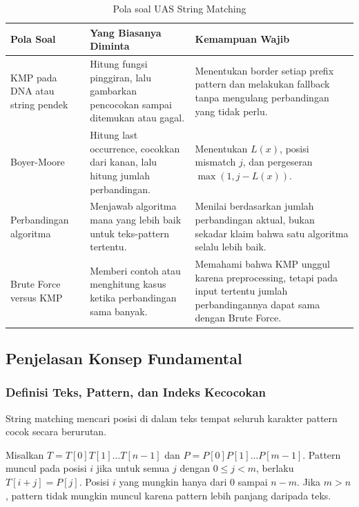 \begin{table}[H]
\centering
\small
\begin{tabularx}{\textwidth}{|L{0.23\textwidth}|X|X|}
\hline
\textbf{Pola Soal} & \textbf{Yang Biasanya Diminta} & \textbf{Kemampuan Wajib} \\
\hline
KMP pada DNA atau string pendek & Hitung fungsi pinggiran, lalu gambarkan pencocokan sampai ditemukan atau gagal. & Menentukan border setiap prefix pattern dan melakukan fallback tanpa mengulang perbandingan yang tidak perlu. \\
\hline
Boyer-Moore & Hitung last occurrence, cocokkan dari kanan, lalu hitung jumlah perbandingan. & Menentukan $L(x)$, posisi mismatch $j$, dan pergeseran $\max(1,j-L(x))$. \\
\hline
Perbandingan algoritma & Menjawab algoritma mana yang lebih baik untuk teks-pattern tertentu. & Menilai berdasarkan jumlah perbandingan aktual, bukan sekadar klaim bahwa satu algoritma selalu lebih baik. \\
\hline
Brute Force versus KMP & Memberi contoh atau menghitung kasus ketika perbandingan sama banyak. & Memahami bahwa KMP unggul karena preprocessing, tetapi pada input tertentu jumlah perbandingannya dapat sama dengan Brute Force. \\
\hline
\end{tabularx}
\caption{Pola soal UAS String Matching}
\label{tab:pola-soal-string-matching}
\end{table}

\subsection{Penjelasan Konsep Fundamental}

\subsubsection{Definisi Teks, Pattern, dan Indeks Kecocokan}

\begin{jawab}
String matching mencari posisi di dalam teks tempat seluruh karakter pattern cocok secara berurutan.
\end{jawab}

Misalkan $T=T[0]T[1]\ldots T[n-1]$ dan $P=P[0]P[1]\ldots P[m-1]$. Pattern muncul pada posisi $i$ jika untuk semua $j$ dengan $0\le j<m$, berlaku $T[i+j]=P[j]$. Posisi $i$ yang mungkin hanya dari $0$ sampai $n-m$. Jika $m>n$, pattern tidak mungkin muncul karena pattern lebih panjang daripada teks.

